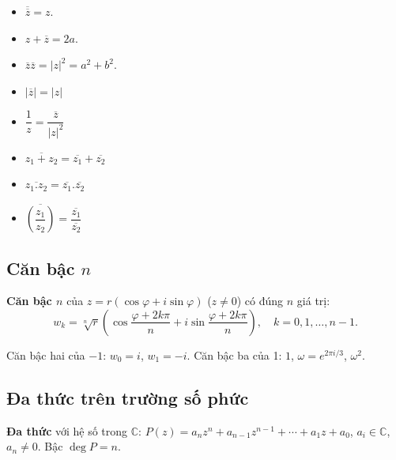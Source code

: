 \documentclass[12pt,a4paper]{article}
\begin{document}
\begin{tinhchat}
  \begin{itemize}
      \item $\overline{\overline{z}} = z$.
      \item $z + \overline{z} = 2a$.
      \item $\overline{z}\overline{z} = |z|^2 = a^2 + b^2$.
      \item $|\overline{z}| = |z|$
      \item $\dfrac{1}{z} = \dfrac{\overline{z}}{|z|^2}$
      \item $\overline{z_1 + z_2} = \overline{z_1} + \overline{z_2}$
      \item $\overline{z_1 . z_2} = \overline{z_1} . \overline{z_2}$
      \item $\overline{(\dfrac{z_1}{z_2})} = \dfrac{\overline{z_1}}{\overline{z_2}}$
  \end{itemize}
\end{tinhchat}

\subsection{Căn bậc $n$}

\begin{dinhnghia}
  \textbf{Căn bậc $n$} của $z = r(\cos\varphi + i\sin\varphi)$ ($z \ne 0$) có đúng $n$ giá trị:
  \[
    w_k = \sqrt[n]{r}\left(\cos\frac{\varphi + 2k\pi}{n} + i\sin\frac{\varphi + 2k\pi}{n}\right), \quad k = 0, 1, \ldots, n-1.
  \]
\end{dinhnghia}

\begin{vidu}
  Căn bậc hai của $-1$: $w_0 = i$, $w_1 = -i$. Căn bậc ba của 1: $1$, $\omega = e^{2\pi i/3}$, $\omega^2$.
\end{vidu}

\subsection{Đa thức trên trường số phức}

\begin{dinhnghia}
  \textbf{Đa thức} với hệ số trong $\mathbb{C}$: $P(z) = a_n z^n + a_{n-1} z^{n-1} + \cdots + a_1 z + a_0$, $a_i \in \mathbb{C}$, $a_n \ne 0$. Bậc $\deg P = n$.
\end{dinhnghia}

\end{document}
